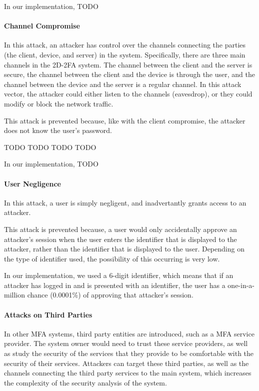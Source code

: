 \documentclass[11pt]{article} %
\begin{document}
In our implementation, TODO

\paragraph{Channel Compromise}
In this attack, an attacker has control over the channels connecting the
parties (the client, device, and server) in the system. Specifically,
there are three main channels in the 2D-2FA system. The channel between
the client and the server is secure, the channel between the client and
the device is through the user, and the channel between the device and
the server is a regular channel. In this attack vector, the attacker
could either listen to the channels (eavesdrop), or they could modify or
block the network traffic. 

This attack is prevented because, like with the client compromise, the
attacker does not know the user's password. 

TODO TODO TODO TODO

In our implementation, TODO


\paragraph{User Negligence}
In this attack, a user is simply negligent, and inadvertantly grants
access to an attacker. 

This attack is prevented because, a user would only accidentally approve
an attacker's session when the user enters the identifier that is
displayed to the attacker, rather than the identifier that is displayed
to the user. Depending on the type of identifier used, the possibility
of this occurring is very low.

In our implementation, we used a 6-digit identifier, which means that if
an attacker has logged in and is presented with an identifier, the user
has a one-in-a-million chance (0.0001\%) of approving that attacker's
session. 

\paragraph{Attacks on Third Parties}
In other MFA systems, third party entities are introduced, such as a MFA
service provider. The system owner would need to trust these service
providers, as well as study the security of the services that they
provide to be comfortable with the security of their services. Attackers
can target these third parties, as well as the channels connecting the
third party services to the main system, which increases the complexity
of the security analysis of the system. 
\end{document}
